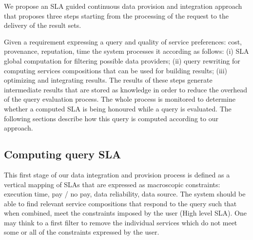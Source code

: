 We propose an SLA guided continuous data provision and integration approach that proposes three steps  starting from the processing of the request  to the delivery of the result sets.

Given a requirement expressing a query and quality of service preferences: cost, provenance, reputation, time the system processes it according as follows: (i) SLA global computation for filtering possible data providers; (ii) query rewriting for computing services compositions that can be used for building results; (iii) optimizing and integrating results. The results of these steps generate intermediate results that are stored as knowledge in order to reduce the overhead of the query evaluation process. The whole process is monitored to determine whether a computed SLA is being honoured while a query is evaluated. 
The following sections describe how this query is computed according to our approach. 





\subsection{Computing query SLA}
\label{sec:slaModel}

%

This first stage of our data integration and provision process is  defined as a vertical mapping of SLAs that are expressed as macroscopic constraints: execution time, pay / no pay, data reliability, data source. The system should be able to find relevant service compositions that respond to the query  such that when combined, meet the constraints imposed by the user (High level SLA). One may think to a first filter to remove the individual services which do not meet some or all of the constraints expressed by the user. 

